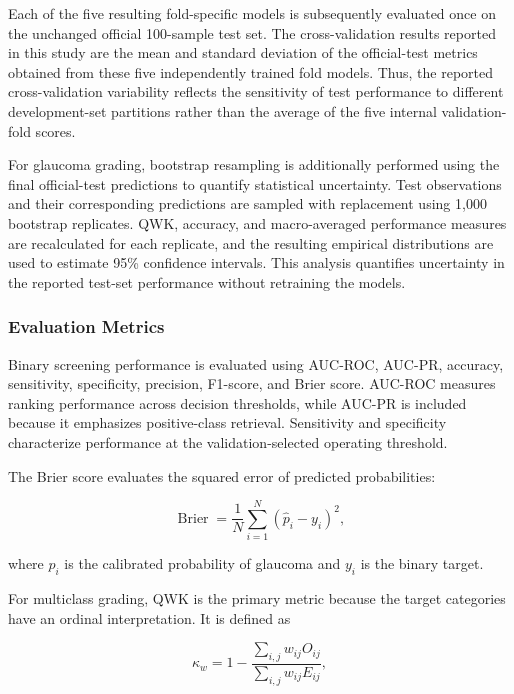 \documentclass[preprint,12pt]{elsarticle}
\begin{document}
Each of the five resulting fold-specific models is subsequently evaluated once on the unchanged official 100-sample test set. The cross-validation results reported in this study are the mean and standard deviation of the official-test metrics obtained from these five independently trained fold models. Thus, the reported cross-validation variability reflects the sensitivity of test performance to different development-set partitions rather than the average of the five internal validation-fold scores.

For glaucoma grading, bootstrap resampling is additionally performed using the final official-test predictions to quantify statistical uncertainty. Test observations and their corresponding predictions are sampled with replacement using 1,000 bootstrap replicates. QWK, accuracy, and macro-averaged performance measures are recalculated for each replicate, and the resulting empirical distributions are used to estimate 95\% confidence intervals. This analysis quantifies uncertainty in the reported test-set performance without retraining the models.

\subsubsection{Evaluation Metrics}
\label{subsubsec:evaluation_metrics}

Binary screening performance is evaluated using AUC-ROC, AUC-PR, accuracy, sensitivity, specificity, precision, F1-score, and Brier score. AUC-ROC measures ranking performance across decision thresholds, while AUC-PR is included because it emphasizes positive-class retrieval. Sensitivity and specificity characterize performance at the validation-selected operating threshold.

The Brier score evaluates the squared error of predicted probabilities:

\begin{equation}
    \operatorname{Brier}
    =
    \frac{1}{N}
    \sum_{i=1}^{N}
    \left(
    \hat{p}_{i}-y_{i}
    \right)^2,
    \label{eq:brier_score}
\end{equation}

where $\hat{p}_{i}$ is the calibrated probability of glaucoma and $y_i$ is the binary target.

For multiclass grading, QWK is the primary metric because the target categories have an ordinal interpretation. It is defined as

\begin{equation}
    \kappa_{w}
    =
    1-
    \frac{
    \sum_{i,j}w_{ij}O_{ij}
    }{
    \sum_{i,j}w_{ij}E_{ij}
    },
    \label{eq:qwk_metric}
\end{equation}
\end{document}
